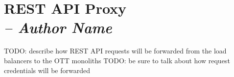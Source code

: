 \chapter{REST API Proxy \\
  \small{\textit{-- Author Name}}
  \label{Chapter::RestApiProxy}}


TODO: describe how REST API requests will be forwarded from the load balancers to the OTT monoliths
TODO: be sure to talk about how request credentials will be forwarded